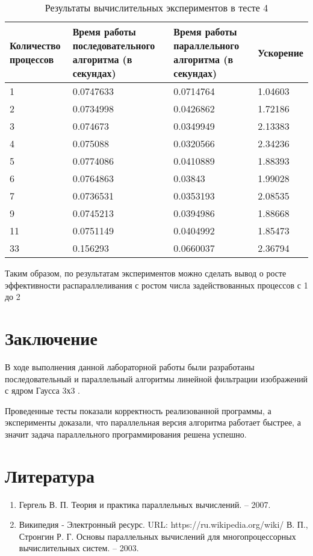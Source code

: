 \documentclass{report}
\begin{document}
\begin{table}[!h]
\caption{Результаты вычислительных экспериментов в тесте 4}
\centering
\begin{tabular}{| p{2cm} | p{3cm} | p{4cm} | p{2cm} |}
\hline
Количество процессов & Время работы последовательного алгоритма (в секундах) & Время работы параллельного алгоритма (в секундах) & Ускорение  \\[5pt]
\hline
1        & 0.0747633        & 0.0714764     & 1.04603       \\
2        & 0.0734998        & 0.0426862     & 1.72186       \\
3        & 0.074673        & 0.0349949     &  2.13383      \\
4        & 0.075088        &  0.0320566     &  2.34236       \\
5        & 0.0774086        & 0.0410889     & 1.88393      \\
6        &  0.0764863        & 0.03843     & 1.99028       \\
7        & 0.0736531        & 0.0353193     & 2.08535       \\
9        & 0.0745213        & 0.0394986     & 1.88668	    \\
11        &  0.0751149        &  0.0404992   & 1.85473	  \\
33        & 0.156293        & 0.0660037     & 2.36794	  \\
\hline
\end{tabular}
\end{table}
Таким образом, по результатам экспериментов можно сделать вывод о росте эффективности  распараллеливания с ростом числа задействованных процессов с  1 до  2


\newpage

\section*{Заключение}
В ходе выполнения  данной лабораторной работы были разработаны последовательный и параллельный алгоритмы  линейной фильтрации изображений с ядром Гаусса 3х3 .
\par Проведенные тесты показали корректность реализованной программы, а  эксперименты доказали, что параллельная версия алгоритма работает быстрее, а значит задача параллельного программирования решена успешно.
\newpage

\section*{Литература}
\begin{enumerate}

\item Гергель В. П. Теория и практика параллельных вычислений. – 2007. 
\item Википедия - Электронный ресурс. URL: https://ru.wikipedia.org/wiki/%
 В. П., Стронгин Р. Г. Основы параллельных вычислений для многопроцессорных вычислительных систем. – 2003.
\end{enumerate} 
\newpage
\end{document}

